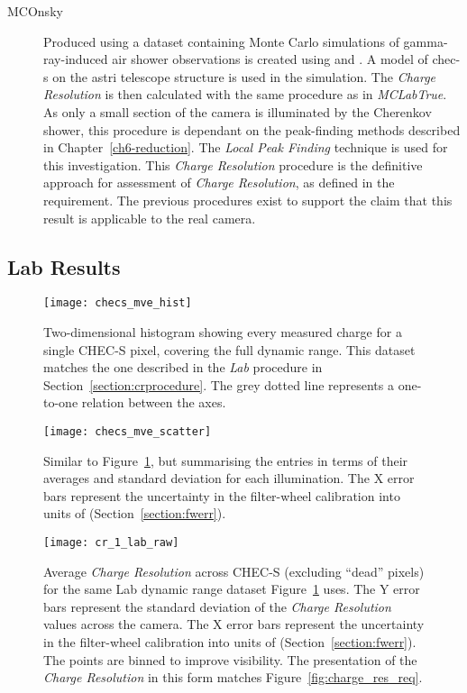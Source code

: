 \begin{description}
\item [MCOnsky] Produced using a dataset containing Monte Carlo simulations of gamma-ray-induced air shower observations is created using  and . A model of \gls{chec-s} on the \gls{astri} telescope structure is used in the simulation. The \textit{Charge Resolution} is then calculated with the same procedure as in \textit{MCLabTrue}. As only a small section of the camera is illuminated by the Cherenkov shower, this procedure is dependant on the peak-finding methods described in Chapter~\ref{ch6-reduction}. The \textit{Local Peak Finding} technique is used for this investigation. This \textit{Charge Resolution} procedure is the definitive approach for assessment of \textit{Charge Resolution}, as defined in the requirement. The previous procedures exist to support the claim that this result is applicable to the real camera.
\end{description}

\subsection{Lab Results}

\begin{figure}
	\centering
    \texttt{[image: checs\_mve\_hist]} 
	\caption[CHEC-S measured charge versus average expected charge.]{Two-dimensional histogram showing every measured charge for a single CHEC-S pixel, covering the full dynamic range. This dataset matches the one described in the \textit{Lab} procedure in Section~\ref{section:crprocedure}. The grey dotted line represents a one-to-one relation between the axes.}
	\label{fig:checs_mve_hist}
\end{figure}

\begin{figure}
	\centering
    \texttt{[image: checs\_mve\_scatter]} 
	\caption[CHEC-S average measured charge versus average expected charge.]{Similar to Figure~\ref{fig:checs_mve_hist}, but summarising the entries in terms of their averages and standard deviation for each illumination. The X error bars represent the uncertainty in the filter-wheel calibration into units of \si{\pe} (Section~\ref{section:fwerr}).}
	\label{fig:checs_mve_scatter}
\end{figure}

\begin{figure}
	\centering
    \texttt{[image: cr\_1\_lab\_raw]} 
	\caption[\textit{Charge Resolution} of the Lab dataset in default units.]{Average \textit{Charge Resolution} across CHEC-S (excluding ``dead'' pixels) for the same Lab dynamic range dataset Figure~\ref{fig:checs_mve_hist} uses. The Y error bars represent the standard deviation of the \textit{Charge Resolution} values across the camera. The X error bars represent the uncertainty in the filter-wheel calibration into units of \si{\pe} (Section~\ref{section:fwerr}). The points are binned to improve visibility. The presentation of the \textit{Charge Resolution} in this form matches Figure~\ref{fig:charge_res_req}.}
	\label{fig:cr_1_lab_raw}
\end{figure}

